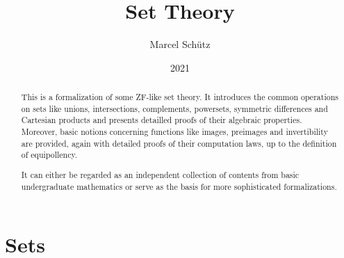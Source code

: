 \documentclass{article}
\title{Set Theory}
\author{Marcel Schütz}
\date{2021}
\begin{document}
  \maketitle

  \begin{abstract}
    This is a formalization of some ZF-like set theory.
    It introduces the common operations on sets like unions, intersections,
    complements, powersets, symmetric differences and Cartesian products and
    presents detailled proofs of their algebraic properties.
    Moreover, basic notions concerning functions like images, preimages and
    invertibility are provided, again with detailed proofs of their computation
    laws, up to the definition of equipollency.

    It can either be regarded as an independent collection of contents from
    basic undergraduate mathematics or serve as the basis for more
    sophisticated formalizations.
  \end{abstract}

  \tableofcontents

  \newpage
  \part{Sets}

  
  \begin{comment}
    \begin{forthel}
      [readtex \path{set-theory/sections/01_sets/01_sets.ftl.tex}]
    \end{forthel}
  \end{comment}

  
  \begin{comment}
    \begin{forthel}
      [readtex \path{set-theory/sections/01_sets/02_powerset.ftl.tex}]
    \end{forthel}
  \end{comment}

  
  \begin{comment}
    \begin{forthel}
      [readtex \path{set-theory/sections/01_sets/03_regularity.ftl.tex}]
    \end{forthel}
  \end{comment}

  
  \begin{comment}
    \begin{forthel}
      [readtex \path{set-theory/sections/01_sets/04_symmetric-difference.ftl.tex}]
    \end{forthel}
  \end{comment}
\end{document}

